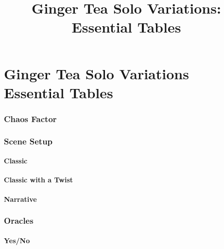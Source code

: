 

\title{Ginger Tea Solo Variations: Essential Tables}


\mainmatter
\chapter*{Ginger Tea Solo Variations\hspace*{8cm} Essential Tables \version}
\subsection{Chaos Factor}


\subsection{Scene Setup}
\subsubsection{Classic}

\subsubsection{Classic with a Twist}

\subsubsection{Narrative}


\newpage
\subsection{Oracles}
\subsubsection{Yes/No}


